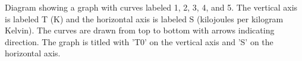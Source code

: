 Diagram showing a graph with curves labeled 1, 2, 3, 4, and 5. The vertical axis is labeled T (K) and the horizontal axis is labeled S (kilojoules per kilogram Kelvin). The curves are drawn from top to bottom with arrows indicating direction. The graph is titled with 'T0' on the vertical axis and 'S' on the horizontal axis.
